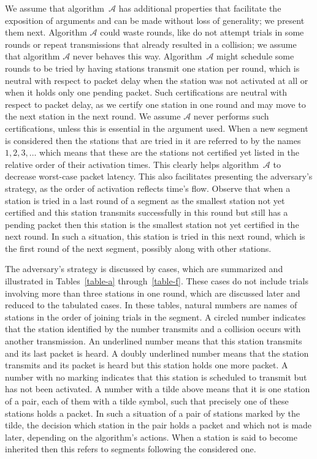 \documentclass[11pt]{article}
\newcommand{\cA}{{\mathcal A}}
\begin{document}
We assume that algorithm~$\cA$ has additional properties that facilitate the exposition of arguments and can be made without loss of generality; we present them next.
Algorithm $\cA$ could waste rounds, like do not attempt trials  in some rounds  or repeat transmissions that already resulted in a collision; we assume that algorithm $\cA$ never behaves this way.
Algorithm~$\cA$ might schedule some rounds to be tried by having stations transmit one station per round, which is neutral with respect to packet delay when the station was not activated at all or when it holds only one pending packet.
Such certifications are neutral with respect to packet delay, as we certify one station in one round and may move to the next station in the next round.
We assume $\cA$ never performs such certifications, unless this is essential in the argument used.
When a new segment is considered then the stations that are tried in it are referred to by the names $1,2,3,\ldots$ which means that these are the stations not certified yet listed in the relative order of their activation times.
This clearly helps algorithm~$\cA$ to decrease worst-case packet latency.
This also facilitates presenting the adversary's strategy, as the order of activation reflects time's flow.
Observe that when a station is tried in a last round of a segment as the smallest station not yet certified and this station transmits successfully in this round but still has a pending packet then this station is the smallest station not yet certified in the next round.
In such a situation, this station is tried in this next round, which is the first round of the next segment, possibly along with other stations.


The adversary's strategy is discussed by cases, which are summarized and illustrated in Tables~\ref{table-a} through~\ref{table-f}.
These cases do not include trials involving more than three stations in one round, which are discussed later and reduced to the tabulated cases.
In these tables, natural numbers are names of stations in the order of joining trials in the segment.
A circled number indicates that the station identified by the number transmits and a collision occurs with another transmission.
An underlined number means  that this station transmits and its last packet is heard.
A doubly underlined number means that the station transmits and its packet is heard but this station holds one more packet.
A number with no marking indicates that this station is scheduled to transmit but has not been activated.
A number with a tilde above means that it is one station of a pair, each of them with a tilde symbol, such that precisely one of these stations holds a packet.
In such a situation of a pair of stations marked by the tilde, the decision which station in the pair holds a packet and which not is made later, depending on the algorithm's actions.
When a station is said to become inherited then this refers to segments following the considered one.
\end{document}
